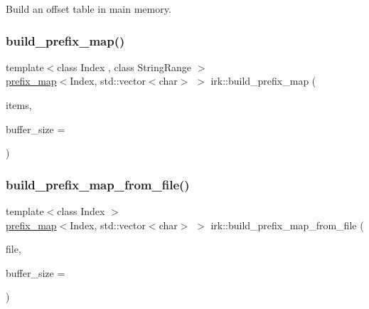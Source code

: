 Build an offset table in main memory. 

\mbox{\label{namespaceirk_a9e498e43015b0fba26ed452bb2981d21}} 
\subsubsection{\texorpdfstring{build\+\_\+prefix\+\_\+map()}{build\_prefix\_map()}}
{\footnotesize\ttfamily template$<$class Index , class String\+Range $>$ \\
\mbox{\hyperlink{classirk_1_1prefix__map}{prefix\+\_\+map}}$<$Index, std\+::vector$<$char$>$ $>$ irk\+::build\+\_\+prefix\+\_\+map (\begin{DoxyParamCaption}\item[{const String\+Range \&}]{items,  }\item[{std\+::size\+\_\+t}]{buffer\+\_\+size = {} }\end{DoxyParamCaption})}

\mbox{\label{namespaceirk_aae903af083f9e6a98e9d5f232322a2f2}} 
\subsubsection{\texorpdfstring{build\+\_\+prefix\+\_\+map\+\_\+from\+\_\+file()}{build\_prefix\_map\_from\_file()}}
{\footnotesize\ttfamily template$<$class Index $>$ \\
\mbox{\hyperlink{classirk_1_1prefix__map}{prefix\+\_\+map}}$<$Index, std\+::vector$<$char$>$ $>$ irk\+::build\+\_\+prefix\+\_\+map\+\_\+from\+\_\+file (\begin{DoxyParamCaption}\item[{fs\+::path}]{file,  }\item[{std\+::size\+\_\+t}]{buffer\+\_\+size = {} }\end{DoxyParamCaption})}

\mbox{\label{namespaceirk_ab92f82aeeb765f3464ca61f190d8f919}} 
